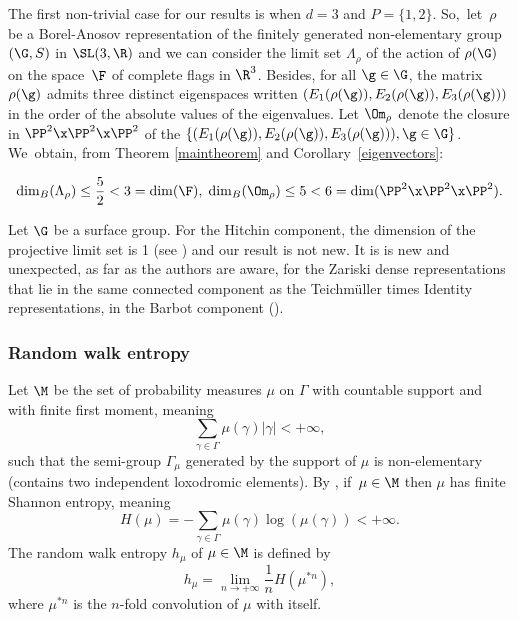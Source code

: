 The first non-trivial case for our results is when \(d=3\) and \(P= \{1,2\}\). So,~let~\(\rho \) be a Borel-Anosov representation of the finitely generated non-elementary group \((\G, S)\) in \(\SL(3,\R) \) and we can consider the limit set \(\Lambda_\rho \) of the action of \(\rho(\G) \) on the space~\(\F\) of complete flags in \(\R^3\). Besides, for all \(\g \in \G\), the matrix \(\rho(\g)\) admits three distinct eigenspaces written \((E_1 (\rho(\g)), E_2 (\rho(\g)), E_3 (\rho(\g)))\) in the order of the absolute values of the eigenvalues. Let \(\Om_\rho \) denote the closure in \(\PP^2\x\PP^2\x\PP^2\) of the \(\{(E_1 (\rho(\g)), E_2 (\rho(\g)), E_3 (\rho(\g))), \g \in \G \} \). We~obtain, from Theorem \ref{maintheorem} and Corollary~\ref{eigenvectors}:

\skpt
\begin{corollary}\label{2.5, 5}\mbox{}\vspace*{-\baselineskip}
\[
\dim_B(\Lambda_\rho) \le \frac{5}{2} < 3 = \dim(\F), \; \dim_B(\Om_\rho) \le 5 < 6 = \dim (\PP^2\x\PP^2\x\PP^2).
\]
\end{corollary}
Let \(\G\) be a surface group. For the Hitchin component, the dimension of the projective limit set is 1 (see \cite{Lab06}) and our result is not new. It is is new and unexpected, as far as the authors are aware, for the Zariski dense representations that lie in the same connected component as the Teichmüller times Identity representations, \ie in the Barbot component (\cf \cite{barbot}).


\subsubsection{Random walk entropy}

Let \(\M\) be the set of probability measures \(\mu\) on \(\Gamma\) with countable support and with finite first moment, meaning
\[
\sum_{\gamma \in \Gamma}\mu(\gamma) |\gamma| < +\infty,
\]
such that the semi-group \(\Gamma_\mu\) generated by the support of \(\mu\) is non-elementary (\ie contains two independent loxodromic elements).
By \cite{KV83}, if~\(\mu \in \M\) then \(\mu\) has finite Shannon entropy, meaning
\[
H(\mu) = -\sum_{\gamma \in \Gamma}\mu(\gamma)\log(\mu(\gamma)) < +\infty.
\]
The random walk entropy \(h_\mu\) of \(\mu \in \M\) is defined by
\begin{equation}\label{rwentropy} h_\mu = \lim_{n \to +\infty}\frac{1}{n}H(\mu^{\ast n}),\end{equation}
where \(\mu^{\ast n}\) is the \(n\)-fold convolution of \(\mu\) with itself.

